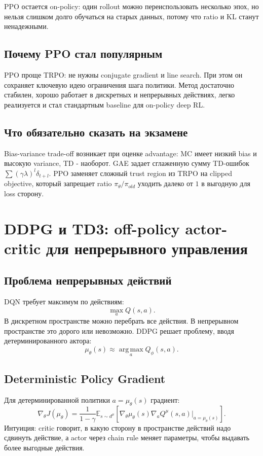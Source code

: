 \documentclass[11pt,a4paper]{article}
\newcommand{\E}{\mathbb{E}}
\newcommand{\argmax}{\operatorname*{arg\,max}}
\newcommand{\1}{\mathbf{1}}
\begin{document}
PPO остается on-policy: один rollout можно переиспользовать несколько эпох, но нельзя слишком долго обучаться на старых данных, потому что ratio и KL станут ненадежными.

\subsection*{Почему PPO стал популярным}
PPO проще TRPO: не нужны conjugate gradient и line search. При этом он сохраняет ключевую идею ограничения шага политики. Метод достаточно стабилен, хорошо работает в дискретных и непрерывных действиях, легко реализуется и стал стандартным baseline для on-policy deep RL.

\subsection*{Что обязательно сказать на экзамене}
Bias-variance trade-off возникает при оценке advantage: MC имеет низкий bias и высокую variance, TD - наоборот. GAE задает сглаженную сумму TD-ошибок $\sum(\gamma\lambda)^l\delta_{t+l}$. PPO заменяет сложный trust region из TRPO на clipped objective, который запрещает ratio $\pi_\theta/\pi_{old}$ уходить далеко от $1$ в выгодную для loss сторону.

\newpage
\section{DDPG и TD3: off-policy actor-critic для непрерывного управления}

\subsection*{Проблема непрерывных действий}
DQN требует максимум по действиям:
\[
    \max_a Q(s,a).
\]
В дискретном пространстве можно перебрать все действия. В непрерывном пространстве это дорого или невозможно. DDPG решает проблему, вводя детерминированного актора:
\[
    \mu_\theta(s)\approx \argmax_a Q_\phi(s,a).
\]

\subsection*{Deterministic Policy Gradient}
Для детерминированной политики $a=\mu_\theta(s)$ градиент:
\[
    \nabla_\theta J(\mu_\theta)=
    \frac1{1-\gamma}\E_{s\sim d^{\mu}}
    \left[\nabla_\theta\mu_\theta(s)\nabla_a Q^\mu(s,a)\big|_{a=\mu_\theta(s)}\right].
\]
Интуиция: critic говорит, в какую сторону в пространстве действий надо сдвинуть действие, а actor через chain rule меняет параметры, чтобы выдавать более выгодные действия.
\end{document}
